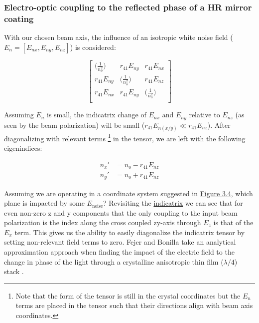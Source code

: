 \subsubsection{Electro-optic coupling to the reflected phase of a HR mirror coating}
With our chosen beam axis, the influence of an isotropic white noise field ($E_n = [E_{nx},E_{ny},E_{nz}]$) is considered:

\begin{equation}
 \left[ {\begin{array}{ccc}
   \big( \frac{1}{n_o ^2} \big)& r_{41}E_{ny} & r_{41} E_{nx}\\
   r_{41}E_{ny} & \big( \frac{1}{n_o ^2} \big) & r_{41} E_{nz}\\
   r_{41} E_{nx} & r_{41} E_{ny} & \big( \frac{1}{n_o ^2} \big)\\
  \end{array}} \right]
\end{equation}

Assuming $E_n$ is small, the indicatrix change of $E_{nx}$ and $E_{ny}$ relative to $E_{nz}$ (as seen by the beam polarization) will be small ($r_{41}E_{n(x/y)} \ll r_{41}E_{nz}$). After diagonalizing with relevant terms \footnote{Note that the form of the tensor is still in the crystal coordinates but the $E_n$ terms are placed in the tensor such that their directions align with beam axis coordinates.} in the tensor, we are left with the following eigenindices:

\begin{equation}
\begin{aligned}
n_x' & = n_o - r_{41}E_{nz} \\
n_y' & = n_o + r_{41}E_{nz}
\end{aligned}
\end{equation}


Assuming we are operating in a coordinate system suggested in \hyperref[fig:algaas_coords]{Figure 3.4}, which plane is impacted by some $E_\mathrm{noise}$? Revisiting the \hyperref[eq:zindicatrix]{indicatrix} we can see that for even non-zero z and y components that the only coupling to the input beam polarization is the index along the cross coupled zy-axis through $E_z$ is that of the $E_x$ term. This gives us the ability to easily diagonalize the indicatrix tensor by setting non-relevant field terms to zero.
Fejer and Bonilla take an analytical approximation approach when finding the impact of the electric field to the change in phase of the light through a crystalline anisotropic thin film ($\lambda/4$) stack \cite{bonillafejer}.

